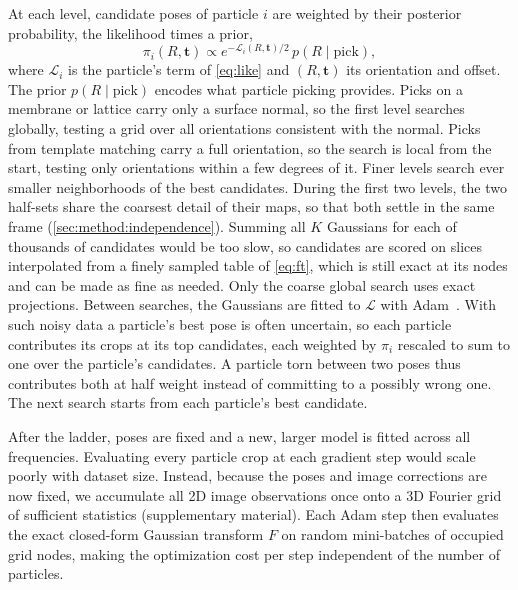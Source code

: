 At each level, candidate poses of particle $i$ are weighted by their posterior probability, the likelihood times a prior,
\begin{equation}
\pi_i(R,\mathbf{t})\propto e^{-\mathcal{L}_i(R,\mathbf{t})/2}\,p(R\mid\text{pick}),
\label{eq:posterior}
\end{equation}
where $\mathcal{L}_i$ is the particle's term of \cref{eq:like} and $(R,\mathbf{t})$ its orientation and offset.
The prior $p(R\mid\text{pick})$ encodes what particle picking provides.
Picks on a membrane or lattice carry only a surface normal, so the first level searches globally, testing a grid over all orientations consistent with the normal.
Picks from template matching carry a full orientation, so the search is local from the start, testing only orientations within a few degrees of it.
Finer levels search ever smaller neighborhoods of the best candidates.
During the first two levels, the two half-sets share the coarsest detail of their maps, so that both settle in the same frame (\cref{sec:method:independence}).
Summing all $K$ Gaussians for each of thousands of candidates would be too slow, so candidates are scored on slices interpolated from a finely sampled table of \cref{eq:ft}, which is still exact at its nodes and can be made as fine as needed.
Only the coarse global search uses exact projections.
Between searches, the Gaussians are fitted to $\mathcal{L}$ with Adam~\cite{kingma2015adam}.
With such noisy data a particle's best pose is often uncertain, so each particle contributes its crops at its top candidates, each weighted by $\pi_i$ rescaled to sum to one over the particle's candidates.
A particle torn between two poses thus contributes both at half weight instead of committing to a possibly wrong one.
The next search starts from each particle's best candidate.

After the ladder, poses are fixed and a new, larger model is fitted across all frequencies. Evaluating every particle crop at each gradient step would scale poorly with dataset size. Instead, because the poses and image corrections are now fixed, we accumulate all 2D image observations once onto a 3D Fourier grid of sufficient statistics (supplementary material).%
Each Adam step then evaluates the exact closed-form Gaussian transform $F$ on random mini-batches of occupied grid nodes, making the optimization cost per step independent of the number of particles.


